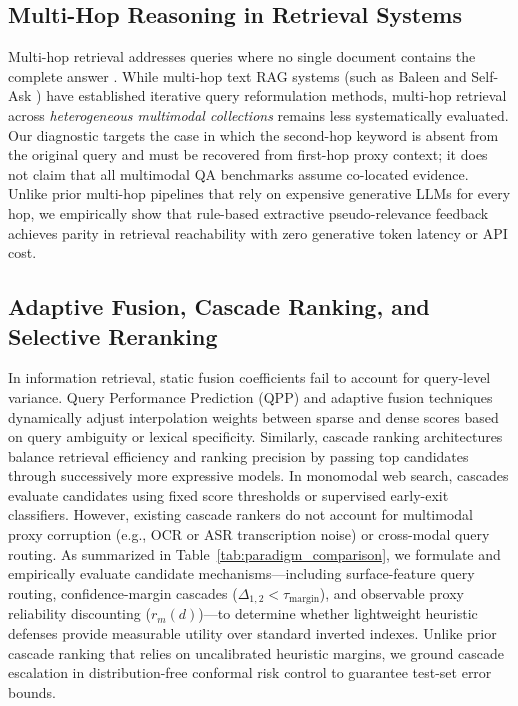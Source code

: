 \documentclass[conference]{IEEEtran}
\begin{document}
\subsection{Multi-Hop Reasoning in Retrieval Systems}
Multi-hop retrieval addresses queries where no single document contains the complete answer \cite{xiong2021multihop, khattab2021baleen}. While multi-hop text RAG systems (such as Baleen \cite{khattab2021baleen} and Self-Ask \cite{press2023selfask}) have established iterative query reformulation methods, multi-hop retrieval across \textit{heterogeneous multimodal collections} remains less systematically evaluated. Our diagnostic targets the case in which the second-hop keyword is absent from the original query and must be recovered from first-hop proxy context; it does not claim that all multimodal QA benchmarks assume co-located evidence. Unlike prior multi-hop pipelines that rely on expensive generative LLMs for every hop, we empirically show that rule-based extractive pseudo-relevance feedback achieves parity in retrieval reachability with zero generative token latency or API cost.

\subsection{Adaptive Fusion, Cascade Ranking, and Selective Reranking}
In information retrieval, static fusion coefficients fail to account for query-level variance. Query Performance Prediction (QPP) \cite{carmel2010qpp} and adaptive fusion techniques dynamically adjust interpolation weights between sparse and dense scores based on query ambiguity or lexical specificity. Similarly, cascade ranking architectures \cite{wang2011cascade, gallagher2019cascade} balance retrieval efficiency and ranking precision by passing top candidates through successively more expressive models. In monomodal web search, cascades evaluate candidates using fixed score thresholds or supervised early-exit classifiers. However, existing cascade rankers do not account for multimodal proxy corruption (e.g., OCR or ASR transcription noise) or cross-modal query routing. As summarized in Table~\ref{tab:paradigm_comparison}, we formulate and empirically evaluate candidate mechanisms---including surface-feature query routing, confidence-margin cascades ($\Delta_{1,2} < \tau_{\text{margin}}$), and observable proxy reliability discounting ($r_m(d)$)---to determine whether lightweight heuristic defenses provide measurable utility over standard inverted indexes. Unlike prior cascade ranking that relies on uncalibrated heuristic margins, we ground cascade escalation in distribution-free conformal risk control to guarantee test-set error bounds.
\end{document}

